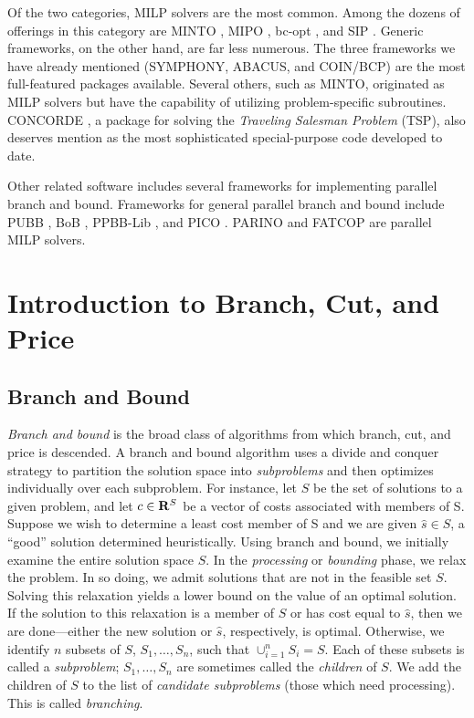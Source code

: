 Of the two categories, MILP solvers are the most common. Among the
dozens of offerings in this category are MINTO \cite{MINTO}, MIPO
\cite{MIPO}, bc-opt \cite{bc-opt}, and SIP \cite{SIP}. Generic
frameworks, on the other hand, are far less numerous. The three
frameworks we have already mentioned (SYMPHONY, ABACUS, and COIN/BCP)
are the most full-featured packages available. Several others, such as
MINTO, originated as MILP solvers but have the capability of utilizing
problem-specific subroutines. CONCORDE \cite{concorde, concorde2}, a
package for solving the {\em Traveling Salesman Problem} (TSP), also
deserves mention as the most sophisticated special-purpose code
developed to date.

Other related software includes several frameworks for implementing
parallel branch and bound. Frameworks for general parallel branch and
bound include PUBB \cite{PUBB}, BoB \cite{BoB}, PPBB-Lib
\cite{PPBB-Lib}, and PICO \cite{PICO}. PARINO \cite{PARINO} and FATCOP
\cite{chen:fatcop2} are parallel MILP solvers.

\section{Introduction to Branch, Cut, and Price}
\label{B&C-intro}

\subsection{Branch and Bound}

{\em Branch and bound} is the broad class of algorithms from which
branch, cut, and price is descended. A branch and bound algorithm uses
a divide and conquer strategy to partition the solution space into
{\em subproblems} and then optimizes individually over each
subproblem. For instance, let $S$ be the set of solutions to a given
problem, and let $c \in {\bf R}^S$ be a vector of costs associated
with members of S. Suppose we wish to determine a least cost member of
S and we are given $\hat{s} \in S$, a ``good'' solution determined
heuristically. Using branch and bound, we initially examine the entire
solution space $S$. In the {\em processing} or {\em bounding} phase,
we relax the problem. In so doing, we admit solutions that are not in
the feasible set $S$. Solving this relaxation yields a lower bound on
the value of an optimal solution. If the solution to this relaxation
is a member of $S$ or has cost equal to $\hat{s}$, then we are
done---either the new solution or $\hat{s}$, respectively, is optimal.
Otherwise, we identify $n$ subsets of $S$, $S_1, \ldots, S_n$, such
that $\cup_{i = 1}^n S_i = S$. Each of these subsets is called a {\em
subproblem}; $S_1, \ldots, S_n$ are sometimes called the {\em
children} of $S$. We add the children of $S$ to the list of {\em
candidate subproblems} (those which need processing). This is called
{\em branching}.


